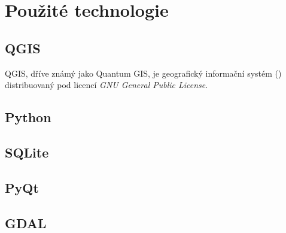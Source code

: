 \chapter{Použité technologie}
\label{3-technologie}


\section{QGIS}
\label{qgis}

QGIS, dříve známý jako Quantum GIS, je geografický informační systém () distribuovaný pod licencí \textit{GNU
General Public License}. 

\section{Python}
\label{python}


\section{SQLite}
\label{gdal}


\section{PyQt}
\label{pyqt}


\section{GDAL}
\label{gdal}

